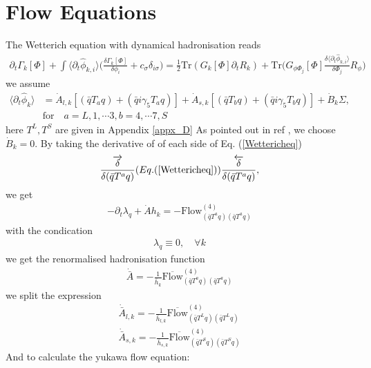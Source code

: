 \documentclass[12pt]{article}
\begin{document}
\section{Flow Equations}

The  Wetterich equation with dynamical hadronisation reads
\begin{align}
\partial_t \Gamma_k[\Phi]+\int \langle  \partial_t  \hat \phi_{k,i}\rangle \bigg ( \frac{\delta \Gamma_k [\Phi]}{\delta \phi_i}+c_\sigma \delta_{i \sigma}\bigg )
=\frac{1}{2} \text{Tr}(G_k[\Phi] \partial_t R_k)+\text{Tr}\bigg( G_{\phi \Phi_j} [\Phi] \frac{\delta \langle  \partial_t  \hat \phi_{k,i}\rangle}{\delta \Phi_j } R_{\phi} \bigg) \label{Wettericheq}
\end{align}
we assume 
\begin{align}
\langle  \partial_t  \hat \phi_{k}\rangle&= \dot{A}_{l,k}[(\bar q T_a  q)+(\bar q i \gamma _5 T_a q)]+\dot{A}_{s,k}[(\bar q T_b  q)+(\bar q i \gamma _5 T_b q)] +\dot{B}_k \Sigma,\\
&\text{for} \quad a=L,1,\cdots 3,b=4,\cdots7, S \nonumber
\end{align}
here $T^L,T^S$ are given in Appendix \ref{appx_D}
As pointed out in ref \cite{} , we choose $\dot{B}_k =0$.
By taking the derivative of of each side of Eq. (\ref{Wettericheq})
\begin{align}
\frac{\overrightarrow{\delta}}{\delta(\bar q T^a q)}(Eq. (\ref{Wettericheq}))\frac{\overleftarrow{\delta}}{\delta (\bar q T^a q)},
\end{align}
we get
\begin{align}
- \partial_t \lambda_q + \dot{A} h_{k}=-\text{Flow} _{(\bar q T^a q) (\bar q T^a q)}^{(4)}
\end{align}
with the condication
\begin{align}\label{lambda_eq}
\lambda_q  \equiv 0 , \quad \forall k
\end{align}
we get the renormalised hadronisation function
\begin{align}
\dot{\bar A}=-\frac{1}{\bar h_k}\overline{  \text{Flow} }_{(\bar q T^a q) (\bar q T^a q)}^{(4)}
\end{align}
we split the expression
\begin{align}
\dot{\bar A}_{l,k}=-\frac{1}{\bar h_{l,k}}\overline{  \text{Flow} }_{(\bar q T^L q) (\bar q T^L q)}^{(4)} \\
\dot{\bar A}_{s,k}=-\frac{1}{\bar h_{s,k}}\overline{  \text{Flow} }_{(\bar q T^S q) (\bar q T^S  q)}^{(4)}
\end{align}
And to calculate the yukawa flow equation:
\end{document}
